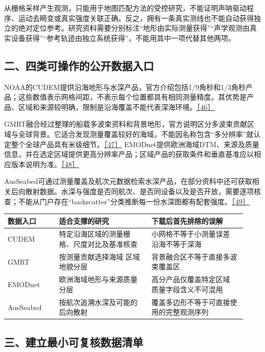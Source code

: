 从栅格采样产生观测，只能用于地图匹配方法的受控研究，不能证明声呐驱动程序、运动去畸变或真实强度关联正确。反之，拥有一条真实测线也不能自动获得独立的绝对定位参考。研究资料需要分别标注``地形由实际测量获得''``声学观测由真实设备获得''``参考轨迹由独立系统获得''，不能用其中一项代替其他两项。

\hypertarget{ux4e8cux56dbux7c7bux53efux64cdux4f5cux7684ux516cux5f00ux6570ux636eux5165ux53e3}{%
\subsection{二、四类可操作的公开数据入口}\label{ux4e8cux56dbux7c7bux53efux64cdux4f5cux7684ux516cux5f00ux6570ux636eux5165ux53e3}}

NOAA的CUDEM提供沿海地形与水深产品，官方介绍包括1/9角秒和1/3角秒产品；这些数值表示网格间距，不表示每个位置都具有相同测量精度。其优势是产品、区域和来源较明确，限制是沿海覆盖不能代表深海环境。\href{https://www.ncei.noaa.gov/products/coastal-elevation-models}{［46］}

GMRT融合经过整理的船载多波束资料和背景地形，官方说明区分多波束贡献区域与全球背景。它适合发现测量覆盖较好的海域，不能因名称包含``多分辨率''就认定整个全球产品具有米级细节。\href{https://gmrt.org/about/index.php}{［47］} EMODnet提供欧洲海域DTM、来源及质量信息，并在选定区域提供更高分辨率产品；区域产品的获取条件和垂直基准应以相应版本说明为准。\href{https://emodnet.ec.europa.eu/en/bathymetry}{［48］}

AusSeabed可通过测量覆盖及航次元数据检索水深产品，在部分资料中还可获取相关后向散射数据。水深与强度是否同航次、是否同设备以及是否开放，需要逐项核查；不能从门户存在``backscatter''分类推断每一份水深图都有配套强度。\href{https://www.ausseabed.gov.au/data/bathymetry}{［49］}

\begin{longtable}[]{@{}p{0.20\linewidth}p{0.36\linewidth}p{0.37\linewidth}@{}}
\toprule
数据入口 & 适合支撑的研究 & 下载后首先排除的误解\tabularnewline
\midrule
\endhead
CUDEM & 特定沿海区域的测量栅格、尺度对比及基准核查 & 小网格不等于小测量误差 沿海不等于深海\tabularnewline
GMRT & 按测量贡献选择海域 区域地貌分层 & 背景融合区不等于直接多波束覆盖区\tabularnewline
EMODnet & 欧洲海域地形与来源质量分层 & 高分产品仅覆盖特定区域 质量字段含义不可混用\tabularnewline
AusSeabed & 按航次追溯水深及可能的后向散射 & 覆盖多边形不等于可直接使用的完整观测序列\tabularnewline
\bottomrule
\end{longtable}

\hypertarget{ux4e09ux5efaux7acbux6700ux5c0fux53efux590dux6838ux6570ux636eux6e05ux5355}{%
\subsection{三、建立最小可复核数据清单}\label{ux4e09ux5efaux7acbux6700ux5c0fux53efux590dux6838ux6570ux636eux6e05ux5355}}

